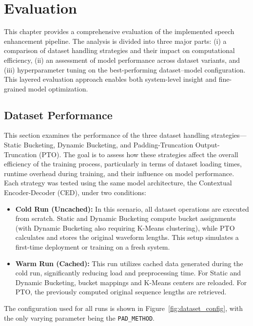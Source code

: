 \graphicspath{{content/chapters/7_evaluation/figures/}}
\chapter{Evaluation}
\label{chp:evaluation}

This chapter provides a comprehensive evaluation of the implemented speech enhancement pipeline. The analysis is divided into three major parts: (i) a comparison of dataset handling strategies and their impact on computational efficiency, (ii) an assessment of model performance across dataset variants, and (iii) hyperparameter tuning on the best-performing dataset–model configuration. This layered evaluation approach enables both system-level insight and fine-grained model optimization.

\section{Dataset Performance}
\label{sec:dataset_performance}

This section examines the performance of the three dataset handling strategies—Static Bucketing, Dynamic Bucketing, and Padding-Truncation Output-Truncation (PTO). The goal is to assess how these strategies affect the overall efficiency of the training process, particularly in terms of dataset loading times, runtime overhead during training, and their influence on model performance. Each strategy was tested using the same model architecture, the Contextual Encoder-Decoder (CED), under two conditions:

\begin{itemize}
    \item \textbf{Cold Run (Uncached):} In this scenario, all dataset operations are executed from scratch. Static and Dynamic Bucketing compute bucket assignments (with Dynamic Bucketing also requiring K-Means clustering), while PTO calculates and stores the original waveform lengths. This setup simulates a first-time deployment or training on a fresh system.
    
    \item \textbf{Warm Run (Cached):} This run utilizes cached data generated during the cold run, significantly reducing load and preprocessing time. For Static and Dynamic Bucketing, bucket mappings and K-Means centers are reloaded. For PTO, the previously computed original sequence lengths are retrieved.
\end{itemize}

The configuration used for all runs is shown in Figure~\ref{fig:dataset_config}, with the only varying parameter being the \texttt{PAD\_METHOD}.

